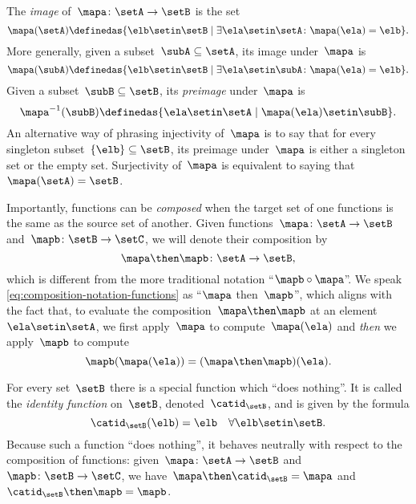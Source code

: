 The \emph{image} of~$\mapa\colon \setA \to \setB$ is the set
\begin{equation*}
    \mapa(\setA) \definedas \{ \elb \setin\setB \mid \exists \ela \setin\setA \colon \mapa(\ela) = \elb \}.
\end{equation*}
More generally, given a subset~$\subA \subseteq \setA$, its image under~$\mapa$ is
\begin{equation*}
    \mapa(\subA) \definedas \{ \elb \setin\setB \mid \exists \ela \setin\subA \colon \mapa(\ela) = \elb \}.
\end{equation*}
Given a subset~$\subB \subseteq \setB$, its \emph{preimage} under~$\mapa$ is
\begin{equation*}
    \mapa^{-1}(\subB) \definedas \{ \ela \setin\setA \mid  \mapa(\ela) \setin\subB \}.
\end{equation*}
An alternative way of phrasing injectivity of~$\mapa$ is to say that for every singleton subset~$\{ \elb \} \subseteq \setB$, its preimage under~$\mapa$ is either a singleton set or the empty set.
Surjectivity of~$\mapa$ is equivalent to saying that~$\mapa(\setA) = \setB$.

Importantly, functions can be \emph{composed} when the target set of one functions is the same as the source set of another.
Given functions~$\mapa\colon \setA \to \setB$ and~$\mapb \colon \setB \to \setC$, we will denote their composition by
\begin{equation}
    \label{eq:composition-notation-functions}
    \mapa \then \mapb \colon \setA \to \setB,
\end{equation}
which is different from the more traditional notation ``$\mapb \circ \mapa$''.
We speak \cref{eq:composition-notation-functions} as ``$\mapa$ then~$\mapb$'', which aligns with the fact that, to evaluate the composition~$\mapa \then \mapb$ at an element~$\ela \setin\setA$, we first apply~$\mapa$ to compute~$\mapa(\ela)$ and \emph{then} we apply~$\mapb$ to compute
\begin{equation*}
    \mapb(\mapa(\ela))=(\mapa \then \mapb)(\ela).
\end{equation*}

For every set~$\setB$ there is a special function which ``does nothing''.
It is called the \emph{identity function} on~$\setB$, denoted~$\catid_\setB$, and is given by the formula
\begin{equation*}
    \catid_\setB(\elb) = \elb \quad \forall  \elb \setin\setB.
\end{equation*}
Because such a function ``does nothing'', it behaves neutrally with respect to the composition of functions: given~$\mapa \colon \setA \to \setB$ and~$\mapb \colon \setB \to \setC$, we have~$\mapa \then \catid_\setB = \mapa$ and~$\catid_\setB \then \mapb = \mapb$.

